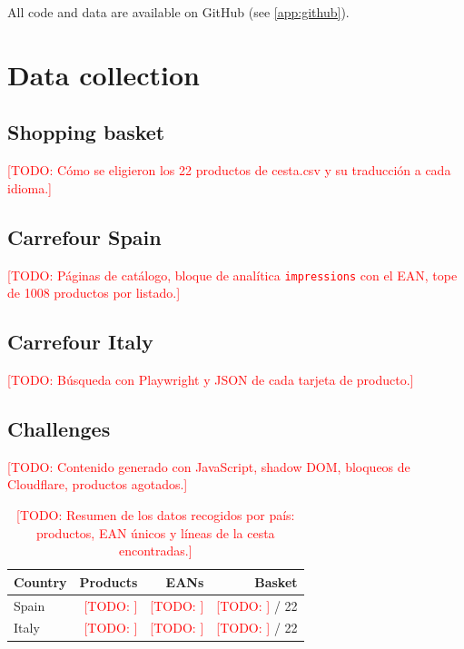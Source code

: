 \documentclass[11pt,a4paper,twocolumn]{article}
\newcommand{\todo}[1]{\textcolor{red}{[TODO: #1]}}
\begin{document}
All code and data are available on GitHub (see \cref{app:github}).

\section{Data collection}

\subsection{Shopping basket}
\todo{Cómo se eligieron los 22 productos de cesta.csv y su traducción a cada idioma.}

\subsection{Carrefour Spain}
\todo{Páginas de catálogo, bloque de analítica \texttt{impressions} con el EAN, tope de 1008 productos por listado.}

\subsection{Carrefour Italy}
\todo{Búsqueda con Playwright y JSON de cada tarjeta de producto.}

\subsection{Challenges}
\todo{Contenido generado con JavaScript, shadow DOM, bloqueos de Cloudflare, productos agotados.}

\begin{table}[ht]
    \centering
    \small
    \begin{tabular}{lrrr}
        \toprule
        Country & Products & EANs & Basket \\
        \midrule
        Spain   & \todo{}  & \todo{}     & \todo{} / 22 \\
        Italy   & \todo{}  & \todo{}     & \todo{} / 22 \\
        \bottomrule
    \end{tabular}
    \caption{\todo{Resumen de los datos recogidos por país: productos, EAN únicos y líneas de la cesta encontradas.}}
    \label{tab:datasets}
\end{table}

\end{document}
